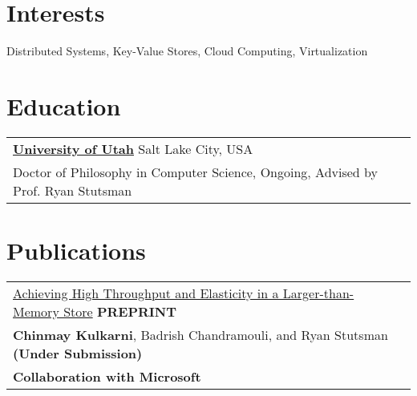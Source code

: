 \documentclass[margin,line]{res}
\begin{document}
\name{Chinmay Kulkarni (www.chinmayk.net, github.com/chinkulkarni) %
}
\begin{resume}

\section{\sc Interests}
Distributed Systems, Key-Value Stores, Cloud Computing, Virtualization

\section{\sc Education}
 \begin{tabular}{@{}p{5.5in}p{4in}}
  {\bf \href{http://www.cs.utah.edu/}{University of Utah}} \dotfill Salt Lake City,
  USA \\
 {\small Doctor of Philosophy in Computer Science, Ongoing, Advised by Prof. Ryan Stutsman}
 \end{tabular}

\section{\sc Publications}
 \begin{tabular}{@{}p{5.5in}p{4in}}
 \href{https://arxiv.org/abs/2006.03206}{Achieving High Throughput and
 Elasticity in a Larger-than-Memory Store} \hfill
 {\small\bf PREPRINT}\\
 {\small {\bf Chinmay Kulkarni}, Badrish Chandramouli, and Ryan
 Stutsman} \hfill {\small\bf (Under Submission)}\\
 {\small\bf Collaboration with Microsoft}\\
 \end{tabular}


\end{resume}
\end{document}

